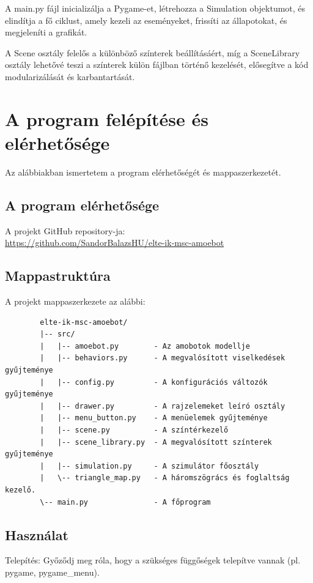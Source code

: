 \documentclass[	
  noindent
]{elteikthesis}[2024/04/26]
\begin{document}
A main.py fájl inicializálja a Pygame-et, létrehozza a Simulation objektumot, és elindítja a fő ciklust, amely kezeli az eseményeket, frissíti az állapotokat, és megjeleníti a grafikát.

A Scene osztály felelős a különböző színterek beállításáért, míg a SceneLibrary osztály lehetővé teszi a színterek külön fájlban történő kezelését, elősegítve a kód modularizálását és karbantartását.

  \section{A program felépítése és elérhetősége}
    Az alábbiakban ismertetem a program elérhetőségét és mappaszerkezetét.

    \subsection{A program elérhetősége}
      A projekt GitHub repository-ja:
      \\
      \url{https://github.com/SandorBalazsHU/elte-ik-msc-amoebot}

    \subsection*{Mappastruktúra}
      A projekt mappaszerkezete az alábbi:
      \begin{verbatim}
        elte-ik-msc-amoebot/
        |-- src/
        |   |-- amoebot.py        - Az amobotok modellje
        |   |-- behaviors.py      - A megvalósított viselkedések gyűjteménye
        |   |-- config.py         - A konfigurációs változók gyűjteménye
        |   |-- drawer.py         - A rajzelemeket leíró osztály
        |   |-- menu_button.py    - A menüelemek gyűjteménye
        |   |-- scene.py          - A színtérkezelő
        |   |-- scene_library.py  - A megvalósított színterek gyűjteménye
        |   |-- simulation.py     - A szimulátor főosztály
        |   \-- triangle_map.py   - A háromszögrács és foglaltság kezelő.
        \-- main.py               - A főprogram
        \end{verbatim}

    \subsection{Használat}

      Telepítés: Győződj meg róla, hogy a szükséges függőségek telepítve vannak (pl. pygame, pygame_menu).
      
\end{document}

